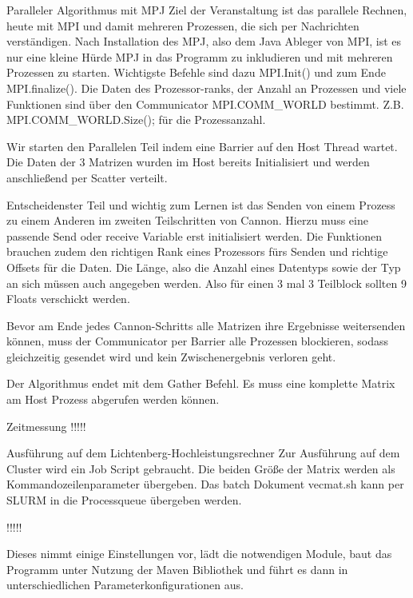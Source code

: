 \documentclass[
ngerman,
subtask=ruled %
]{tudaexercise}
\begin{document}
	
	\begin{task}{Paralleler Algorithmus mit MPJ}
		Ziel der Veranstaltung ist das parallele Rechnen, heute mit MPI und damit mehreren Prozessen, die sich per Nachrichten verständigen.
		Nach Installation des MPJ, also dem Java Ableger von MPI, ist es nur eine kleine Hürde MPJ in das Programm zu inkludieren und mit mehreren Prozessen zu starten.
		Wichtigste Befehle sind dazu MPI.Init() und zum Ende MPI.finalize(). Die Daten des Prozessor-ranks, der Anzahl an Prozessen und viele Funktionen sind über den Communicator MPI.COMM\_WORLD bestimmt. Z.B. MPI.COMM\_WORLD.Size(); für die Prozessanzahl.
		
		Wir starten den Parallelen Teil indem eine Barrier auf den Host Thread wartet.
		Die Daten der 3 Matrizen wurden im Host bereits Initialisiert und werden anschließend per Scatter verteilt.
		
		Entscheidenster Teil und wichtig zum Lernen ist das Senden von einem Prozess zu einem Anderen im zweiten Teilschritten von Cannon.
		Hierzu muss eine passende Send oder receive Variable erst initialisiert werden. Die Funktionen brauchen zudem den richtigen Rank eines Prozessors fürs Senden und richtige Offsets für die Daten. Die Länge, also die Anzahl eines Datentyps sowie der Typ an sich müssen auch angegeben werden. Also für einen 3 mal 3 Teilblock sollten 9 Floats verschickt werden.
		
		Bevor am Ende jedes Cannon-Schritts alle Matrizen ihre Ergebnisse weitersenden können, muss der Communicator per Barrier alle Prozessen blockieren, sodass gleichzeitig gesendet wird und kein Zwischenergebnis verloren geht.
		
		Der Algorithmus endet mit dem Gather Befehl. Es muss eine komplette Matrix am Host Prozess abgerufen werden können.
	
	\end{task}
	
	\begin{task}{Zeitmessung}
		!!!!!
	
		
	\end{task}
	
	\begin{task}{Ausführung auf dem Lichtenberg-Hochleistungsrechner} 
		Zur Ausführung auf dem Cluster wird ein Job Script gebraucht. 
		Die beiden Größe der Matrix werden als Kommandozeilenparameter übergeben.
		Das batch Dokument vecmat.sh kann per SLURM in die Processqueue übergeben werden.
		
		!!!!!
		
		Dieses nimmt einige Einstellungen vor, lädt die notwendigen Module, baut das Programm unter Nutzung der Maven Bibliothek und führt es dann in unterschiedlichen Parameterkonfigurationen aus.
	\end{task}
\end{document}

